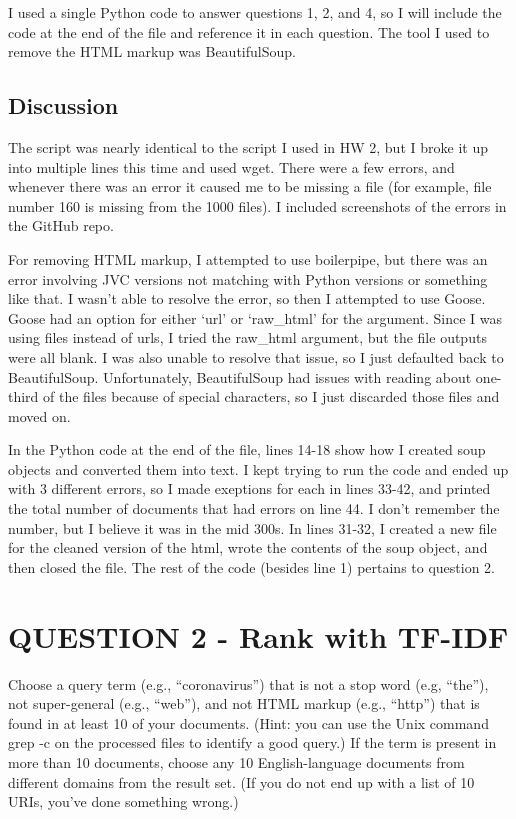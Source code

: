 \documentclass[12pt]{article}
\begin{document}
I used a single Python code to answer questions 1, 2, and 4, so I will include the code at the end of the file and reference it in each question. The tool I used to remove the HTML markup was BeautifulSoup.

\subsection*{Discussion}
The script was nearly identical to the script I used in HW 2, but I broke it up into multiple lines this time and used wget. There were a few errors, and whenever there was an error it caused me to be missing a file (for example, file number 160 is missing from the 1000 files). I included screenshots of the errors in the GitHub repo.

For removing HTML markup, I attempted to use boilerpipe, but there was an error involving JVC versions not matching with Python versions or something like that. I wasn't able to resolve the error, so then I attempted to use Goose. Goose had an option for either `url' or `raw\_html' for the argument. Since I was using files instead of urls, I tried the raw\_html argument, but the file outputs were all blank. I was also unable to resolve that issue, so I just defaulted back to BeautifulSoup. Unfortunately, BeautifulSoup had issues with reading about one-third of the files because of special characters, so I just discarded those files and moved on.

In the Python code at the end of the file, lines 14-18 show how I created soup objects and converted them into text. I kept trying to run the code and ended up with 3 different errors, so I made exeptions for each in lines 33-42, and printed the total number of documents that had errors on line 44. I don't remember the number, but I believe it was in the mid 300s. In lines 31-32, I created a new file for the cleaned version of the html, wrote the contents of the soup object, and then closed the file. The rest of the code (besides line 1) pertains to question 2.

\section*{QUESTION 2 - Rank with TF-IDF}
Choose a query term (e.g., ``coronavirus'') that is not a stop word (e.g, ``the''), not super-general (e.g., ``web''), and not HTML markup (e.g., ``http'') that is found in at least 10 of your documents. (Hint: you can use the Unix command grep -c on the processed files to identify a good query.) If the term is present in more than 10 documents, choose any 10 English-language documents from different domains from the result set. (If you do not end up with a list of 10 URIs, you've done something wrong.)
\end{document}
